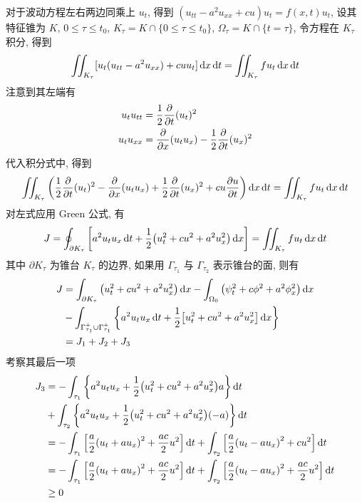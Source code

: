 \solution
对于波动方程左右两边同乘上 $u_t$, 得到
$(u_{tt} - a^2 u_{xx} + cu) u_t = f(x, t) u_t$, 设其特征锥为 $K$,
$0 \leq \tau \leq t_0$, $K_\tau = K \cap \{0 \leq \tau \leq t_0\}$,
$\Omega_\tau = K \cap \{t = \tau\}$, 令方程在 $K_\tau$ 积分, 得到
\[
\iint_{K_\tau} [ u_t(u_{tt} - a^2 u_{xx}) + c u u_t ] \operatorname{d\!} x \operatorname{d\!} t
= \iint_{K_\tau} f u_t \operatorname{d\!} x \operatorname{d\!} t
\]
注意到其左端有
\[ \begin{aligned}
  u_t u_{tt} &= \frac12{{\frac{\partial {}}{\partial {t}}}}(u_t)^2 \\
  u_t u_{xx} &= {{\frac{\partial {}}{\partial {x}}}} (u_t u_x) - \frac12{{\frac{\partial {}}{\partial {t}}}}(u_x)^2
\end{aligned} \]
代入积分式中, 得到
\[
\iint_{K_\tau} \left(
  \frac12{{\frac{\partial {}}{\partial {t}}}}(u_t)^2 - {{\frac{\partial {}}{\partial {x}}}} (u_t u_x)
  + \frac12{{\frac{\partial {}}{\partial {t}}}}(u_x)^2 + c u {\frac{\partial {u}}{\partial {t}}}
\right) \operatorname{d\!} x \operatorname{d\!} t
= \iint_{K_\tau} f u_t \operatorname{d\!} x \operatorname{d\!} t
\]
对左式应用 Green 公式, 有
\[
J = \oint_{\partial K_\tau} {\left[ {
	a^2 u_t u_x \operatorname{d\!} t + \frac12 {\left( {
		u_t^2 + c u^2 + a^2 u_x^2
	} \right)} \operatorname{d\!} x
} \right]} = \iint_{K_\tau} f u_t \operatorname{d\!} x \operatorname{d\!} t
\]
其中 $\partial K_\tau$ 为锥台 $K_\tau$ 的边界, 如果用 $\Gamma_{\tau_1}$ 与
$\Gamma_{\tau_2}$ 表示锥台的面, 则有
\[ \begin{aligned}
J &= \int_{\partial K_\tau} {\left( {
	u_t^2 + c u^2 + a^2 u_x^2
} \right)} \operatorname{d\!} x - \int_{\Omega_0} {\left( {
	\psi_t^2 + c \phi^2 + a^2 \phi_x^2
} \right)} \operatorname{d\!} x \\&- \int_{\Gamma_{\tau_1}^+ \cup \Gamma_{\tau_1}^+} {\left\{ {
	a^2 u_t u_x \operatorname{d\!} t + \frac12 {\left[ {
		u_t^2 + c u^2 + a^2 u_x^2
	} \right]} \operatorname{d\!} x
} \right\}}\\
&= J_1 + J_2 + J_3
\end{aligned} \]
考察其最后一项
\[ \begin{aligned}
J_3 &= -\int_{\tau_1} {\left\{ {
	a^2 u_t u_x + \frac12 {\left( {
		u_t^2 + c u^2 + a^2 u_x^2
	} \right)} a
} \right\}} \operatorname{d\!} t \\	&+ \int_{\tau_2} {\left\{ {
	a^2 u_t u_x + \frac12 {\left( {
		u_t^2 + c u^2 + a^2 u_x^2
	} \right)} (-a)
} \right\}} \operatorname{d\!} t \\
&= -\int_{\tau_1} {\left[ {
	\frac{a}{2} {\left( {
		u_t + a u_x
	} \right)}^2 + \frac{a c}{2}u^2
} \right]} \operatorname{d\!} t + \int_{\tau_2} {\left[ {
	\frac{a}{2} {\left( {
		u_t - a u_x
	} \right)}^2 + c u^2
} \right]} \operatorname{d\!} t \\
&= -\int_{\tau_1} {\left[ {
	\frac{a}{2} {\left( {
		u_t + a u_x
	} \right)}^2 + \frac{a c}{2}u^2
} \right]} \operatorname{d\!} t + \int_{\tau_2} {\left[ {
	\frac{a}{2} {\left( {
		u_t - a u_x
	} \right)}^2 + \frac{a c}{2}u^2
} \right]} \operatorname{d\!} t \\
&\geq 0
\end{aligned} \]
